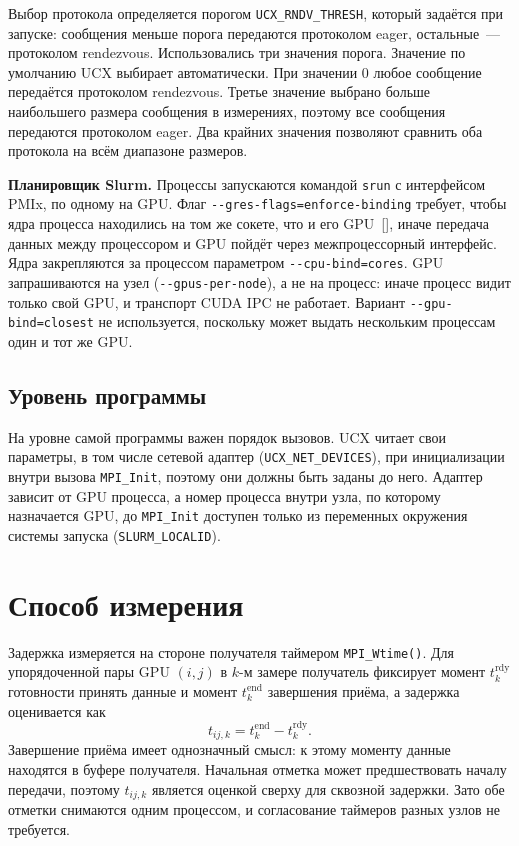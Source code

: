 Выбор протокола определяется порогом \texttt{UCX\_RNDV\_THRESH}, который задаётся при запуске: сообщения меньше порога передаются протоколом eager, остальные~--- протоколом rendezvous. Использовались три значения порога. Значение по умолчанию UCX выбирает автоматически. При значении 0 любое сообщение передаётся протоколом rendezvous. Третье значение выбрано больше наибольшего размера сообщения в измерениях, поэтому все сообщения передаются протоколом eager. Два крайних значения позволяют сравнить оба протокола на всём диапазоне размеров.

\textbf{Планировщик Slurm.} Процессы запускаются командой \texttt{srun} с интерфейсом PMIx, по одному на GPU. Флаг \texttt{-{}-gres-flags=enforce-binding} требует, чтобы ядра процесса находились на том же сокете, что и его GPU~[], иначе передача данных между процессором и GPU пойдёт через межпроцессорный интерфейс. Ядра закрепляются за процессом параметром \texttt{-{}-cpu-bind=cores}. GPU запрашиваются на узел (\texttt{-{}-gpus-per-node}), а не на процесс: иначе процесс видит только свой GPU, и транспорт CUDA IPC не работает. Вариант \texttt{-{}-gpu-bind=closest} не используется, поскольку может выдать нескольким процессам один и тот же GPU.

\subsection{Уровень программы}

На уровне самой программы важен порядок вызовов. UCX читает свои параметры, в том числе сетевой адаптер (\texttt{UCX\_NET\_DEVICES}), при инициализации внутри вызова \texttt{MPI\_Init}, поэтому они должны быть заданы до него. Адаптер зависит от GPU процесса, а номер процесса внутри узла, по которому назначается GPU, до \texttt{MPI\_Init} доступен только из переменных окружения системы запуска (\texttt{SLURM\_LOCALID}).

\section{Способ измерения}

Задержка измеряется на стороне получателя таймером \texttt{MPI\_Wtime()}. Для упорядоченной пары GPU $(i,j)$ в $k$-м замере получатель фиксирует момент $t^{\mathrm{rdy}}_k$ готовности принять данные и момент $t^{\mathrm{end}}_k$ завершения приёма, а задержка оценивается как
\[
    t_{ij,k} = t^{\mathrm{end}}_k - t^{\mathrm{rdy}}_k.
\]
Завершение приёма имеет однозначный смысл: к этому моменту данные находятся в буфере получателя. Начальная отметка может предшествовать началу передачи, поэтому $t_{ij,k}$ является оценкой сверху для сквозной задержки. Зато обе отметки снимаются одним процессом, и согласование таймеров разных узлов не требуется.

